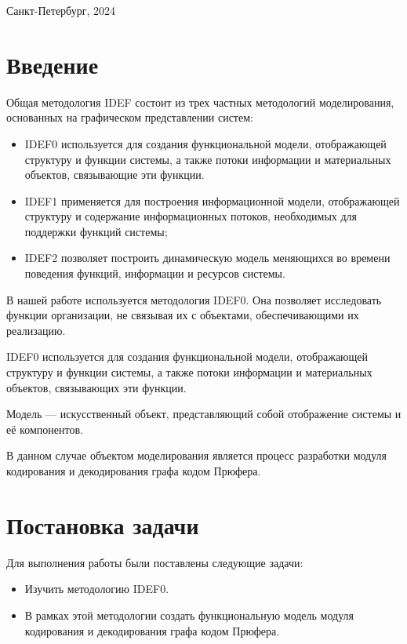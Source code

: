 \documentclass[a4paper, final]{article}
\begin{document}
\hfill \break
\hfill \break
\begin{center} \small{Санкт-Петербург, 2024} \end{center}
\thispagestyle{empty} %

\newpage

\tableofcontents

\newpage

\cleardoublepage
{}
{}
\section*{Введение}
Общая методология IDEF состоит из трех частных
методологий моделирования, основанных на графическом представлении
систем:
\begin{itemize}
  \item IDEF0 используется для создания функциональной модели, отображающей
  структуру и функции системы, а также потоки информации и материальных 
  объектов, связывающие эти функции.
  \item IDEF1 применяется для построения информационной модели, отображающей
  структуру и содержание информационных потоков, необходимых для 
  поддержки функций системы;
  \item IDEF2 позволяет построить динамическую модель меняющихся во времени
  поведения функций, информации и ресурсов системы.
\end{itemize}

В нашей работе используется методология IDEF0. Она позволяет исследовать функции организации, не связывая их с объектами, обеспечивающими
их реализацию.

IDEF0 используется для создания функциональной модели, отображающей структуру и функции системы, а также потоки 
информации и материальных объектов, связывающих эти функции.

Модель --- искусственный объект, представляющий собой отображение системы и её компонентов.

В данном случае объектом моделирования является процесс разработки модуля кодирования и декодирования графа 
кодом Прюфера.

\newpage
\section{Постановка задачи}
\noindent Для выполнения работы были поставлены следующие задачи:
\begin{itemize}
	\item Изучить методологию IDEF0.
	\item В рамках этой методологии создать функциональную модель модуля кодирования и декодирования графа кодом Прюфера.
\end{itemize}
\end{document}
